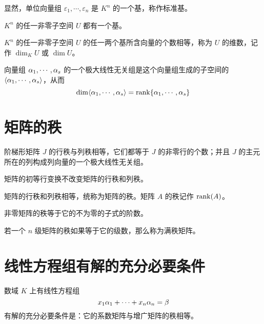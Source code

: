 显然，单位向量组 $\varepsilon_1,\cdots,\varepsilon_n$ 是 $K^n$ 的一个基，称作标准基。

\begin{theorem}
	$K^n$ 的任一非零子空间 $U$ 都有一个基。
\end{theorem}

\begin{theorem}
	$K^n$ 的任一非零子空间 $U$ 的任一两个基所含向量的个数相等，称为 $U$ 的维数，记作 $\dim_KU$ 或 $\dim U$。
\end{theorem}

\begin{theorem}
	向量组 $\alpha_1,\cdots,\alpha_s$ 的一个极大线性无关组是这个向量组生成的子空间的 $\langle \alpha_1,\cdots,\alpha_s \rangle$，从而
	\[\dim\langle \alpha_1,\cdots,\alpha_s \rangle = \operatorname{rank}\{\alpha_1,\cdots,\alpha_s\}\]
\end{theorem}

\section{矩阵的秩}

\begin{theorem}
	阶梯形矩阵 $J$ 的行秩与列秩相等，它们都等于 $J$ 的非零行的个数；并且 $J$ 的主元所在的列构成列向量的一个极大线性无关组。
\end{theorem}

\begin{theorem}
	矩阵的初等行变换不改变矩阵的行秩和列秩。
\end{theorem}

\begin{theorem}
	矩阵的行秩和列秩相等，统称为矩阵的秩。矩阵 $A$ 的秩记作 $\operatorname{rank}(A)$。
\end{theorem}

\begin{theorem}
	非零矩阵的秩等于它的不为零的子式的阶数。
\end{theorem}

若一个 $n$ 级矩阵的秩如果等于它的级数，那么称为满秩矩阵。

\section{线性方程组有解的充分必要条件}

\begin{theorem}
	数域 $K$ 上有线性方程组
	\[x_1\alpha_1 + \cdots + x_n\alpha_n = \beta\]
	有解的充分必要条件是：它的系数矩阵与增广矩阵的秩相等。
\end{theorem}

